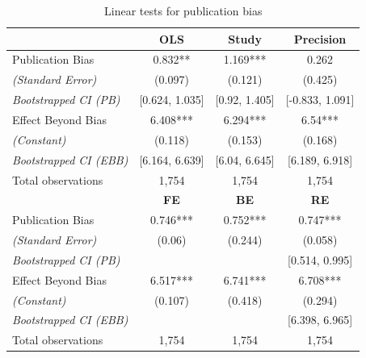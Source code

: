 \begin{table}[!t]
  \centering
  \footnotesize
  \singlespace
  \caption{Linear tests for publication bias}
  \label{tab:PB-FAT}
  \begin{tabular}{
  @{\hskip\tabcolsep\extracolsep}
  l*{3}{c}} %
  \toprule
    \multicolumn{1}{l}{} &
    \multicolumn{1}{c}{\textbf{OLS}} & 
    \multicolumn{1}{c}{\textbf{Study}} &
    \multicolumn{1}{c}{\textbf{Precision}} \\
  \midrule
  
  Publication Bias & 0.832** &  1.169*** & 0.262 \\
  \emph{\hspace{0.2cm}(Standard Error)} & (0.097) & (0.121) & (0.425) \\
  \emph{\hspace{0.2cm}Bootstrapped CI (PB)} & [0.624, 1.035] & [0.92, 1.405] & [-0.833, 1.091] \\
  \addlinespace[0.5em]
  Effect Beyond Bias & 6.408*** & 6.294*** & 6.54*** \\
  \emph{\hspace{0.2cm}(Constant)} & (0.118) &  (0.153) & (0.168) \\
  \emph{\hspace{0.2cm}Bootstrapped CI (EBB)} & [6.164, 6.639] & [6.04, 6.645] & [6.189, 6.918] \\
  \addlinespace[0.5em]
  Total observations & 1,754 & 1,754 & 1,754 \\

  \midrule
    \multicolumn{1}{l}{} &
    \multicolumn{1}{c}{\textbf{FE}} &
    \multicolumn{1}{c}{\textbf{BE}} &
    \multicolumn{1}{c}{\textbf{RE}} \\
  \midrule

  Publication Bias & 0.746*** & 0.752*** & 0.747*** \\
  \emph{\hspace{0.2cm}(Standard Error)} & (0.06) & (0.244) & (0.058) \\
  \emph{\hspace{0.2cm}Bootstrapped CI (PB)} &  &  & [0.514, 0.995] \\
  \addlinespace[0.5em]
  Effect Beyond Bias & 6.517*** & 6.741*** & 6.708*** \\ 
  \emph{\hspace{0.2cm}(Constant)} & (0.107) & (0.418) & (0.294) \\
  \emph{\hspace{0.2cm}Bootstrapped CI (EBB)} &   &  & [6.398, 6.965] \\
  \addlinespace[0.5em]
  Total observations & 1,754 & 1,754 & 1,754 \\
      

\end{tabular}
\end{table}
